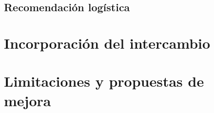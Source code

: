 \documentclass[11pt,letterpaper]{article}
\begin{document}
\subsection{Recomendación logística}

\section{Incorporación del intercambio}

\section{Limitaciones y propuestas de mejora}
\end{document}
